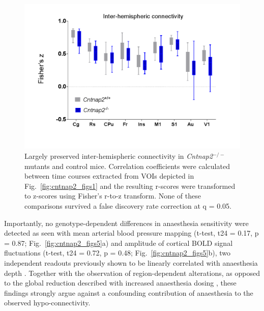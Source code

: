 \begin{figure}[th] 
    \centering
    \includegraphics[scale=0.7]{figures/cntnap2_figure_s4.png}
    \decoRule
    \caption[Largely preserved inter-hemispheric connectivity in \textit{Cntnap2}$^{-/-}$
    mutants and control mice.]{Largely preserved inter-hemispheric connectivity
    in \textit{Cntnap2}$^{-/-}$ mutants and control mice. Correlation coefficients were
    calculated between time courses extracted from VOIs depicted in
    Fig.~\ref{fig:cntnap2_figs1} and the resulting r-scores were transformed to
    z-scores using Fisher’s r-to-z transform. None of these comparisons
    survived a false discovery rate correction at q = 0.05. }
    \label{fig:cntnap2_figs4}
\end{figure}

Importantly, no genotype-dependent differences in anaesthesia sensitivity were
detected as seen with mean arterial blood pressure mapping (t-test, t24 = 0.17,
p = 0.87; Fig.~\ref{fig:cntnap2_figs5}a) and amplitude of cortical BOLD signal
fluctuations (t-test, t24 = 0.72, p = 0.48; Fig.~\ref{fig:cntnap2_figs5}b), two
independent readouts previously shown to be linearly correlated with anaesthesia
depth \parencite{steffey2003, liu2011}.  Together with the observation of
region-dependent alterations, as opposed to the global reduction described with
increased anaesthesia dosing \parencite{nasrallah2014}, these findings strongly
argue against a confounding contribution of anaesthesia to the observed
hypo-connectivity. 


